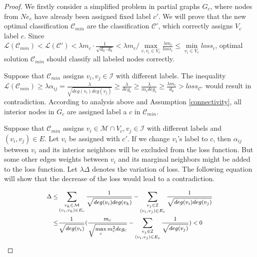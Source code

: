 \begin{proof}
We firstly consider a simplified problem in partial graphs $G_c$, where nodes from $Ne_c$ have already been assigned fixed label $c'$. We will prove that the new optimal classification $\mathcal{C}_{min}$ are the classification $\mathcal{C}'$, which correctly assigns $V_c$ label $c$. Since $\mathcal{L}(\mathcal{C}_{min})<\mathcal{L}(\mathcal{C}') < \lambda m_c\cdot \frac{1}{\sqrt{d_0\cdot d_0}} < \lambda m_c / \max\limits_{c,v_i\in V_c}\frac{\lambda m_c}{loss_i} \leq \min\limits_{v_i\in V_c}loss_i$, optimal solution $\mathcal{C}_{min}$ should classify all labeled nodes correctly. 

Suppose that $\mathcal{C}_{min}$ assigns $v_i,v_j\in \mathcal{I}$ with different labels. The inequality $\mathcal{L}(\mathcal{C}_{min})\geq \lambda\alpha_{ij} = \frac{\lambda}{\sqrt{deg(v_i)deg(v_j)}}\geq \frac{\lambda}{deg_c} \geq \frac{\lambda}{m_cdeg_c} \geq \frac{\lambda m_c}{d_0} > loss_{\mathcal{C}'}$ would result in contradiction.
%
According to analysis above and Assumption \ref{connectivity}, all interior nodes in $G_c$ are assigned label a $c$ in $\mathcal{C}_{min}$.

Suppose that $\mathcal{C}_{min}$ assigns $v_i \in \mathcal{M}\cap V_c, v_j\in \mathcal{I}$ with different labels and $(v_i, v_j)\in E$. Let $v_i$  be assigned with $c'$. If we change $v_i$'s label to $c$, then $\alpha_{ij}$ between $v_i$ and its interior neighbors will be excluded from the loss function. But some other edges weights between $v_i$ and its marginal neighbors might be added to the loss function. Let $\lambda\Delta$ denotes the variation of loss. 
The following equation will show that the decrease of the loss would lead to a contradiction.

\begin{equation*}
\footnotesize
\begin{split}
\Delta \leq & \sum\limits_{\substack{v_k\in \mathcal{M}\\(v_i, v_k) \in E_c}}\frac{1}{\sqrt{deg(v_i)deg(v_k)}} -  \sum\limits_{\substack{v_j\in \mathcal{I}\\(v_i, v_j) \in E_c}}\frac{1}{\sqrt{deg(v_i)deg(v_j)}} \\ 
\leq & \frac{1}{\sqrt{deg(v_i)}} (\frac{m_c}{\sqrt{\max\limits_cm_c^2deg_c}} - \sum\limits_{\substack{v_j\in \mathcal{I}\\(v_i, v_j) \in E_c}}\frac{1}{\sqrt{deg(v_j)}}) < 0
\end{split}
\normalsize
\end{equation*}


\end{proof}
